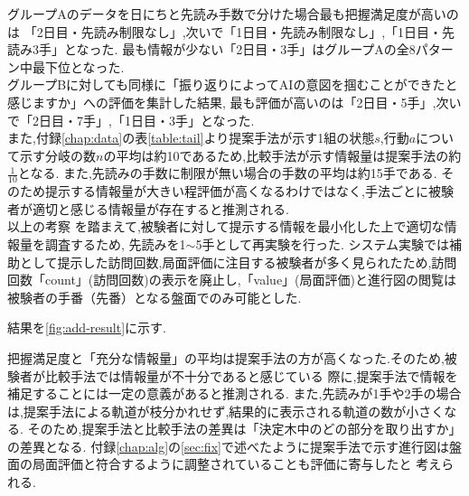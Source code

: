 グループAのデータを日にちと先読み手数で分けた場合最も把握満足度が高いのは
「2日目・先読み制限なし」,次いで「1日目・先読み制限なし」,「1日目・先読み3手」となった.
最も情報が少ない「2日目・3手」はグループAの全8パターン中最下位となった.\\


グループBに対しても同様に「振り返りによってAIの意図を掴むことができたと感じますか」への評価を集計した結果,
最も評価が高いのは「2日目・5手」,次いで「2日目・7手」,「1日目・3手」となった.\\



また,付録\ref{chap:data}の表\ref{table:tail}より提案手法が示す1組の状態$s$,行動$a$について示す分岐の数$n$の平均は約10であるため,比較手法が示す情報量は提案手法の約$\frac{1}{10}$となる.
また,先読みの手数に制限が無い場合の手数の平均は約15手である.
そのため提示する情報量が大きい程評価が高くなるわけではなく,手法ごとに被験者が適切と感じる情報量が存在すると推測される.\\

以上の考察
を踏まえて,被験者に対して提示する情報を最小化した上で適切な情報量を調査するため,
先読みを1$\sim$5手として再実験を行った.
システム実験では補助として提示した訪問回数,局面評価に注目する被験者が多く見られたため,訪問回数「count」(訪問回数)の表示を廃止し,「value」(局面評価)と進行図の閲覧は被験者の手番（先番）となる盤面でのみ可能とした.

結果を\ref{fig:add-result}に示す.

\begin{table}[H]
    \caption{先読み手数制限なしの場合}
    \scriptsize
    \centering
    \label{table:add-result}
\end{table}


把握満足度と「充分な情報量」の平均は提案手法の方が高くなった.そのため,被験者が比較手法では情報量が不十分であると感じている
際に,提案手法で情報を補足することには一定の意義があると推測される.
また,先読みが1手や2手の場合は,提案手法による軌道が枝分かれせず,結果的に表示される軌道の数が小さくなる.
そのため,提案手法と比較手法の差異は「決定木中のどの部分を取り出すか」の差異となる.
付録\ref{chap:alg}の\ref{sec:fix}で述べたように提案手法で示す進行図は盤面の局面評価と符合するように調整されていることも評価に寄与したと
考えられる.
